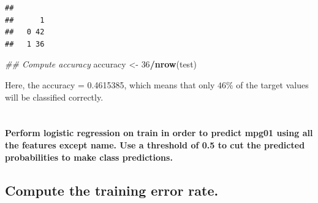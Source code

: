 \documentclass[
  12pt,
  oneside]{report}
\newenvironment{Shaded}{\begin{snugshade}}{\end{snugshade}}
\newcommand{\CommentTok}[1]{\textcolor[rgb]{0.56,0.35,0.01}{\textit{#1}}}
\newcommand{\DataTypeTok}[1]{\textcolor[rgb]{0.13,0.29,0.53}{#1}}
\newcommand{\DecValTok}[1]{\textcolor[rgb]{0.00,0.00,0.81}{#1}}
\newcommand{\FloatTok}[1]{\textcolor[rgb]{0.00,0.00,0.81}{#1}}
\newcommand{\KeywordTok}[1]{\textcolor[rgb]{0.13,0.29,0.53}{\textbf{#1}}}
\newcommand{\NormalTok}[1]{#1}
\newcommand{\OperatorTok}[1]{\textcolor[rgb]{0.81,0.36,0.00}{\textbf{#1}}}
\newcommand{\StringTok}[1]{\textcolor[rgb]{0.31,0.60,0.02}{#1}}
\begin{document}
\begin{verbatim}
##    
##      1
##   0 42
##   1 36
\end{verbatim}

\begin{Shaded}
\begin{Highlighting}[]
\CommentTok{\#\# Compute accuracy}
\NormalTok{accuracy \textless{}{-}}\StringTok{ }\DecValTok{36}\OperatorTok{/}\KeywordTok{nrow}\NormalTok{(test)}
\end{Highlighting}
\end{Shaded}

Here, the accuracy = 0.4615385, which means that only \(46\%\) of the target values will be classified correctly.

\newpage

\hypertarget{section-5}{%
\section{}\label{section-5}}

\textbf{Perform logistic regression on train in order to predict mpg01 using all the features except name. Use a threshold of 0.5 to cut the predicted probabilities to make class predictions.}

\hypertarget{compute-the-training-error-rate.}{%
\subsection{Compute the training error rate.}\label{compute-the-training-error-rate.}}

\begin{Shaded}
\end{Shaded}
\end{document}
